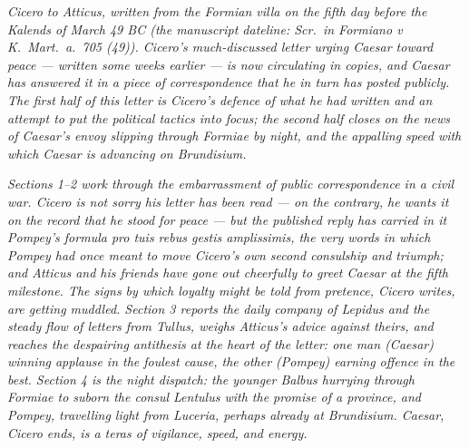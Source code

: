 
\textit{Cicero to Atticus, written from the Formian
villa on the fifth day before the Kalends of March 49
BC (the manuscript dateline: \textit{Scr.\ in Formiano
v K.\ Mart.\ a.\ 705 (49)}). Cicero's much-discussed
letter urging Caesar toward peace --- written some
weeks earlier --- is now circulating in copies, and
Caesar has answered it in a piece of correspondence
that he in turn has posted publicly. The first half of
this letter is Cicero's defence of what he had written
and an attempt to put the political tactics into
focus; the second half closes on the news of Caesar's
envoy slipping through Formiae by night, and the
appalling speed with which Caesar is advancing on
Brundisium.}

\textit{Sections 1--2 work through the embarrassment
of public correspondence in a civil war. Cicero is not
sorry his letter has been read --- on the contrary, he
wants it on the record that he stood for peace --- but
the published reply has carried in it Pompey's formula
\textit{pro tuis rebus gestis amplissimis}, the very
words in which Pompey had once meant to move Cicero's
own second consulship and triumph; and Atticus and his
friends have gone out cheerfully to greet Caesar at
the fifth milestone. The signs by which loyalty might
be told from pretence, Cicero writes, are getting
muddled. Section 3 reports the daily company of
Lepidus and the steady flow of letters from Tullus,
weighs Atticus's advice against theirs, and reaches
the despairing antithesis at the heart of the letter:
one man (Caesar) winning applause in the foulest
cause, the other (Pompey) earning offence in the best.
Section 4 is the night dispatch: the younger Balbus
hurrying through Formiae to suborn the consul Lentulus
with the promise of a province, and Pompey, travelling
light from Luceria, perhaps already at Brundisium.
Caesar, Cicero ends, is a \textit{teras} of vigilance,
speed, and energy.}
